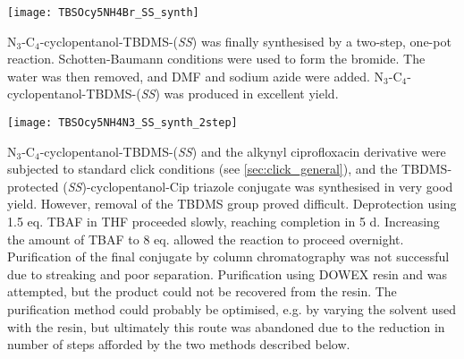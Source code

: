 \begin{scheme}[H]
	\begin{center}
		\texttt{[image: TBSOcy5NH4Br\_SS\_synth]}
		\caption{The attempted synthesis of Br-C$_4$-cyclopentanol-TBDMS-(\textit{SS}) . 
		a) , , , 0 $^{\circ}$C, 2 h. %
		\label{sch:TBSOcy5NH4Br_SS_synth}}
	\end{center}
\end{scheme}


N$_3$-C$_4$-cyclopentanol-TBDMS-(\textit{SS})  was finally synthesised by a two-step, one-pot reaction. Schotten-Baumann conditions were used to form the bromide. The water was then removed, and DMF and sodium azide were added. N$_3$-C$_4$-cyclopentanol-TBDMS-(\textit{SS})  was produced in excellent yield.

\begin{scheme}[H]
	\begin{center}
				
		\texttt{[image: TBSOcy5NH4N3\_SS\_synth\_2step]}
		\caption{
		a) , , , 0 $^{\circ}$C, 3 h.
		b) , DMF, , r.t., 3 h. 
		99.2 \% over 2 steps. %
		\label{sch:TBSOcy5NH4N3_SS_synth_2step}}
	\end{center}
\end{scheme}


N$_3$-C$_4$-cyclopentanol-TBDMS-(\textit{SS})  and the alkynyl ciprofloxacin derivative  were subjected to standard click conditions (see \ref{sec:click_general}), and the TBDMS-protected (\textit{SS})-cyclopentanol-Cip triazole conjugate  was synthesised in very good yield. However, removal of the TBDMS group proved difficult. Deprotection using 1.5 eq. TBAF in THF proceeded slowly, reaching completion in 5 d. Increasing the amount of TBAF to 8 eq. allowed the reaction to proceed overnight.
Purification of the final conjugate  by column chromatography was not successful due to streaking and poor separation. Purification using DOWEX resin and \cite{Kaburagi2007} was attempted, but the product could not be recovered from the resin.
The purification method could probably be optimised, e.g. by varying the solvent used with the resin, but ultimately this route was abandoned due to the reduction in number of steps afforded by the two methods described below.

